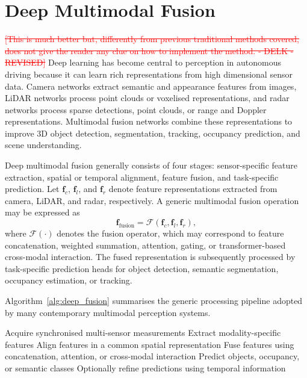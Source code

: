 \documentclass[11pt,oneside,openany]{book}
\newcommand{\deleted}[1]{\textcolor{red}{\sout{#1}}}
\begin{document}
\section{Deep Multimodal Fusion}
\deleted{[This is much better but, differently from previous traditional methods covered, does not give the reader any clue on how to implement the method. - DELK - REVISED]}
Deep learning has become central to perception in autonomous driving because it can learn rich representations from high dimensional sensor data. Camera networks extract semantic and appearance features from images, LiDAR networks process point clouds or voxelised representations, and radar networks process sparse detections, point clouds, or range and Doppler representations. Multimodal fusion networks combine these representations to improve 3D object detection, segmentation, tracking, occupancy prediction, and scene understanding.

Deep multimodal fusion generally consists of four stages: sensor-specific feature extraction, spatial or temporal alignment, feature fusion, and task-specific prediction. Let $\mathbf{f}_c$, $\mathbf{f}_l$, and $\mathbf{f}_r$ denote feature representations extracted from camera, LiDAR, and radar, respectively. A generic multimodal fusion operation may be expressed as
\begin{equation}
\mathbf{f}_{\mathrm{fusion}}
=
\mathcal{F}
\left(
\mathbf{f}_c,
\mathbf{f}_l,
\mathbf{f}_r
\right),
\label{eq:deep_fusion}
\end{equation}
where $\mathcal{F}(\cdot)$ denotes the fusion operator, which may correspond to feature concatenation, weighted summation, attention, gating, or transformer-based cross-modal interaction. The fused representation is subsequently processed by task-specific prediction heads for object detection, semantic segmentation, occupancy estimation, or tracking.

Algorithm~\ref{alg:deep_fusion} summarises the generic processing pipeline adopted by many contemporary multimodal perception systems.

\begin{algorithm}[t]
\caption{Generic Deep Multimodal Fusion Pipeline}
\label{alg:deep_fusion}
\begin{algorithmic}[1]
\State Acquire synchronised multi-sensor measurements
\State Extract modality-specific features
\State Align features in a common spatial representation
\State Fuse features using concatenation, attention, or cross-modal interaction
\State Predict objects, occupancy, or semantic classes
\State Optionally refine predictions using temporal information
\end{algorithmic}
\end{algorithm}
\end{document}
